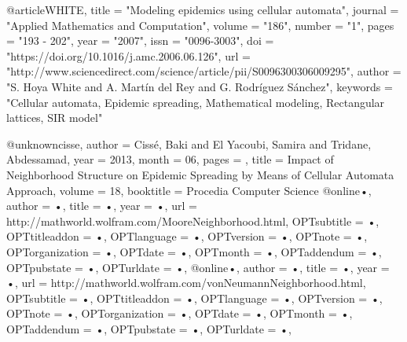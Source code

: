 @article{WHITE,
	title = "Modeling epidemics using cellular automata",
	journal = "Applied Mathematics and Computation",
	volume = "186",
	number = "1",
	pages = "193 - 202",
	year = "2007",
	issn = "0096-3003",
	doi = "https://doi.org/10.1016/j.amc.2006.06.126",
	url = "http://www.sciencedirect.com/science/article/pii/S0096300306009295",
	author = "S. Hoya White and A. Martín del Rey and G. Rodríguez Sánchez",
	keywords = "Cellular automata, Epidemic spreading, Mathematical modeling, Rectangular lattices, SIR model"
}

@unknown{cisse,
author = {Cissé, Baki and El Yacoubi, Samira and Tridane, Abdessamad},
year = {2013},
month = {06},
pages = {},
title = {Impact of Neighborhood Structure on Epidemic Spreading by Means of Cellular Automata Approach},
volume = {18},
booktitle = {Procedia Computer Science}
}
@online{•,
author = {•},
title = {•},
year = {•},
url = {http://mathworld.wolfram.com/MooreNeighborhood.html},
OPTsubtitle = {•},
OPTtitleaddon = {•},
OPTlanguage = {•},
OPTversion = {•},
OPTnote = {•},
OPTorganization = {•},
OPTdate = {•},
OPTmonth = {•},
OPTaddendum = {•},
OPTpubstate = {•},
OPTurldate = {•},
}
@online{•,
author = {•},
title = {•},
year = {•},
url = {http://mathworld.wolfram.com/vonNeumannNeighborhood.html},
OPTsubtitle = {•},
OPTtitleaddon = {•},
OPTlanguage = {•},
OPTversion = {•},
OPTnote = {•},
OPTorganization = {•},
OPTdate = {•},
OPTmonth = {•},
OPTaddendum = {•},
OPTpubstate = {•},
OPTurldate = {•},
}